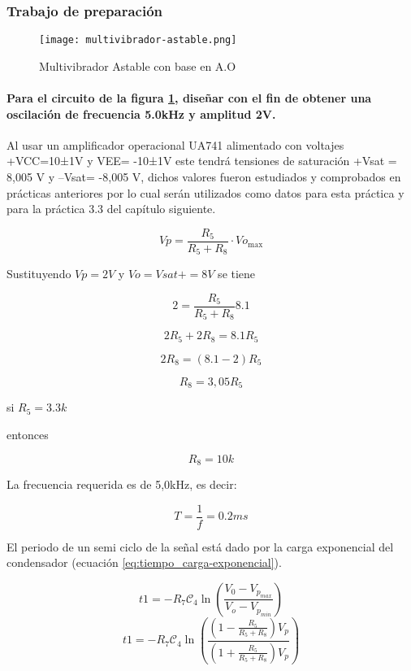 \subsubsection{Trabajo de preparación}

\begin{figure}[ht]
    \centering
    \texttt{[image: multivibrador-astable.png]}
    \caption{Multivibrador Astable con base en A.O}
    \label{fig:multivibrador-astable}
\end{figure}

\paragraph{Para el circuito de la figura \ref{fig:multivibrador-astable}, diseñar con el fin de obtener una oscilación de frecuencia 5.0kHz y amplitud 2V.\\}

Al usar un amplificador operacional UA741 alimentado con voltajes +VCC=10±1V y                     VEE= -10±1V este tendrá tensiones de saturación +Vsat = 8,005 V y –Vsat= -8,005 V, dichos valores fueron estudiados y comprobados en prácticas anteriores por lo cual serán utilizados como datos para esta práctica y para la práctica 3.3 del capítulo siguiente. 

\begin{equation}
    Vp = \frac{R_5}{R_5 + R_8} \cdot Vo_{\text{max}}
\end{equation}

Sustituyendo $Vp= 2V$ y $Vo = Vsat+ = 8V$ se tiene

$$
2 = \frac{R_5}{R_5 + R_8}8.1
$$

$$
2 R_5  + 2 R_8 = 8.1 R_5
$$

$$
2 R_8 = (8.1 - 2) R_5
$$


$$ R_8 = 3,05R_5$$

si $R_5 = 3.3k $

entonces 

$$ R_8 = 10k$$


La frecuencia requerida es de 5,0kHz, es decir:

\begin{equation}
    T = \frac{1}{f} = 0.2ms
\end{equation}

El periodo de un semi ciclo de la señal está dado por la carga exponencial del condensador (ecuación \ref{eq:tiempo_carga-exponencial}).

\[
t1 = - R_7 \mathcal{C}_4 \ln \left( \frac{V_{0} - V_{p_{max}}}{V_{o} - V_{p_{min}}} \right)
\]
\[
t1 = - R_7 \mathcal{C}_4 \ln \left( \frac{(1 - \frac{R_5}{R_5 + R_8})V_p}{(1 + \frac{R_5}{R_5 + R_8})V_p} \right)
\]

